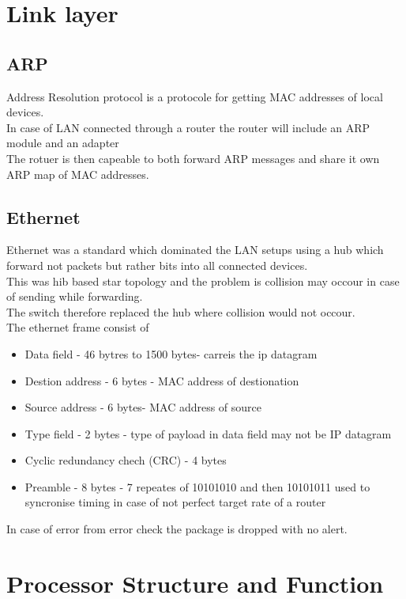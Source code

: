 \documentclass[12pt, a4paper]{article}
\begin{document}
	\section{Link layer}
		\subsection{ARP}
			Address Resolution protocol is a protocole for getting MAC addresses of local devices.\\
			In case of LAN connected through a router the router will include an ARP module and an adapter\\
			The rotuer is then capeable to both forward ARP messages and share it own ARP map of MAC addresses.\\
		\subsection{Ethernet}
			Ethernet was a standard which dominated the LAN setups using a hub which forward not packets but rather bits into all connected devices.\\
			This was hib based star topology and the problem is collision may occour in case of sending while forwarding.\\
			The switch therefore replaced the hub where collision would not occour.\\
			The ethernet frame consist of\\
			\begin{itemize}
				\item Data field - 46 bytres to 1500 bytes- carreis the ip datagram
				\item Destion address - 6 bytes - MAC address of destionation
				\item Source address - 6 bytes- MAC address of source
				\item Type field - 2 bytes - type of payload in data field may not be IP datagram
				\item Cyclic redundancy chech (CRC) - 4 bytes
				\item Preamble - 8 bytes - 7 repeates of 10101010 and then 10101011 used to syncronise timing in case of not perfect target rate of a router
			\end{itemize}
			In case of error from error check the package is dropped with no alert.\\
	\section{Processor Structure and Function}
\end{document}
